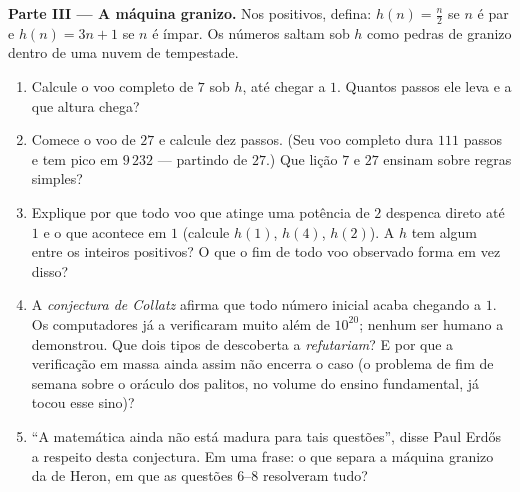 \begin{problem}
\medskip
\noindent\textbf{Parte III --- A máquina granizo.}
Nos  positivos, defina: $h(n) = \frac n2$ se $n$
é par e $h(n) = 3n + 1$ se $n$ é ímpar. Os números saltam sob $h$
como pedras de granizo dentro de uma nuvem de tempestade.
\begin{enumerate}[resume]
  \item Calcule o voo completo de $7$ sob $h$, até chegar a $1$.
        Quantos passos ele leva e a que altura chega?
  \item Comece o voo de $27$ e calcule dez passos. (Seu voo
        completo dura $111$ passos e tem pico em $9\,232$ ---
        partindo de $27$.) Que lição $7$ e $27$ ensinam sobre
        regras simples?
  \item Explique por que todo voo que atinge uma potência de $2$
        despenca direto até $1$ e o que acontece em $1$ (calcule
        $h(1)$, $h(4)$, $h(2)$). A  $h$ tem algum  entre os inteiros positivos? O que o fim de todo voo
        observado forma em vez disso?
  \item A \emph{conjectura de Collatz} afirma que todo número
        inicial acaba chegando a $1$. Os computadores já a
        verificaram muito além de $10^{20}$; nenhum ser humano a
        demonstrou. Que dois tipos de descoberta a
        \emph{refutariam}? E por que a verificação em massa
        ainda assim não encerra o caso (o problema de fim de
        semana sobre o oráculo dos palitos, no volume do ensino
        fundamental, já tocou esse sino)?
  \item ``A matemática ainda não está madura para tais
        questões'', disse Paul Erd\H{o}s a respeito desta
        conjectura. Em uma frase: o que separa a máquina granizo
        da de Heron, em que as questões 6--8 resolveram tudo?
\end{enumerate}


\end{problem}
